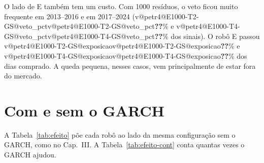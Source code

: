 \documentclass[11pt,a4paper]{article}
\makeatletter
\newcommand{\V}[3]{\ifcsname v@#1@#2@#3\endcsname\csname v@#1@#2@#3\endcsname\else\textbf{\color{red}??}\fi}
\makeatother
\begin{document}
O lado de E também tem um custo. Com 1000 resíduos, o veto ficou muito frequente em 2013--2016 e em 2017--2024
(\V{petr4}{E1000-T2-GS}{veto_pct}\% e \V{petr4}{E1000-T4-GS}{veto_pct}\% dos sinais). O robô E passou
\V{petr4}{E1000-T2-GS}{exposicao}\% e \V{petr4}{E1000-T4-GS}{exposicao}\% dos dias comprado. A queda pequena,
nesses casos, vem principalmente de estar fora do mercado.

\section{Com e sem o GARCH}
\label{sec:efeito}

A Tabela~\ref{tab:efeito} põe cada robô ao lado da mesma configuração sem o GARCH, como no Cap.~III. A
Tabela~\ref{tab:efeito-cont} conta quantas vezes o GARCH ajudou.
\end{document}
